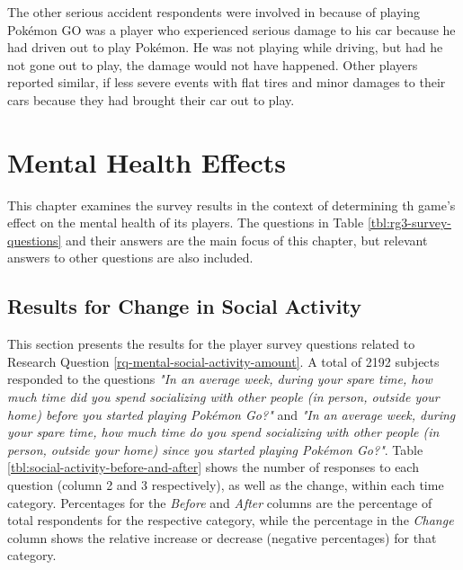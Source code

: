 The other serious accident respondents were involved in because of playing Pokémon GO was a player who experienced serious damage to his car because he had driven out to play Pokémon. He was not playing while driving, but had he not gone out to play, the damage would not have happened. Other players reported similar, if less severe events with flat tires and minor damages to their cars because they had brought their car out to play.


\chapter{Mental Health Effects}
\label{chapter:player-study-mental}

This chapter examines the survey results in the context of determining th game's effect on the mental health of its players. The questions in Table \ref{tbl:rg3-survey-questions} and their answers are the main focus of this chapter, but relevant answers to other questions are also included.

\section{Results for Change in Social Activity}

This section presents the results for the player survey questions related to Research Question \ref{rq-mental-social-activity-amount}. A total of 2192 subjects responded to the questions \emph{"In an average week, during your spare time, how much time did you spend socializing with other people (in person, outside your home) before you started playing Pokémon Go?"} and \emph{"In an average week, during your spare time, how much time do you spend socializing with other people (in person, outside your home) since you started playing Pokémon Go?"}. Table \ref{tbl:social-activity-before-and-after} shows the number of responses to each question (column 2 and 3 respectively), as well as the change, within each time category. Percentages for the \emph{Before} and \emph{After} columns are the percentage of total respondents for the respective category, while the percentage in the \emph{Change} column shows the relative increase or decrease (negative percentages) for that category.

